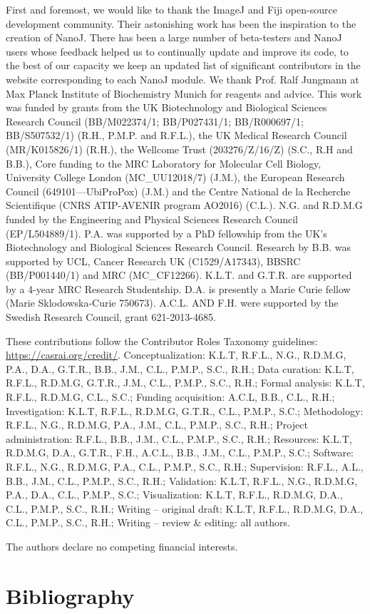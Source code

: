 \begin{acknowledgements}
 First and foremost, we would like to thank the ImageJ and Fiji open-source development community. Their astonishing work has been the inspiration to the creation of NanoJ. There has been a large number of beta-testers and NanoJ users whose feedback helped us to continually update and improve its code, to the best of our capacity we keep an updated list of significant contributors in the website corresponding to each NanoJ module. We thank Prof. Ralf Jungmann at Max Planck Institute of Biochemistry Munich for reagents and advice.  This work was funded by grants from the UK Biotechnology and Biological Sciences Research Council (BB/M022374/1; BB/P027431/1; BB/R000697/1; BB/S507532/1) (R.H., P.M.P. and R.F.L.), the UK Medical Research Council (MR/K015826/1) (R.H.), the Wellcome Trust (203276/Z/16/Z) (S.C., R.H and B.B.), Core funding to the MRC Laboratory for Molecular Cell Biology, University College London (MC\_UU12018/7) (J.M.), the European Research Council (649101—UbiProPox) (J.M.) and the Centre National de la Recherche Scientifique (CNRS ATIP-AVENIR program AO2016) (C.L.). N.G. and R.D.M.G funded by the Engineering and Physical Sciences Research Council (EP/L504889/1). P.A. was supported by a PhD fellowship from the UK’s Biotechnology and Biological Sciences Research Council. Research by B.B. was supported by UCL, Cancer Research UK (C1529/A17343), BBSRC (BB/P001440/1) and MRC (MC\_CF12266). K.L.T. and G.T.R. are supported by a 4-year MRC Research Studentship. D.A. is presently a Marie Curie fellow (Marie Sklodowska-Curie 750673). A.C.L. AND F.H. were supported by the Swedish Research Council, grant 621-2013-4685.
\end{acknowledgements}

\begin{contributions}
 These contributions follow the Contributor Roles Taxonomy guidelines: \href{https://casrai.org/credit/}{https://casrai.org/credit/}.
 Conceptualization: K.L.T, R.F.L., N.G., R.D.M.G, P.A., D.A., G.T.R., B.B., J.M., C.L., P.M.P., S.C., R.H.;
 Data curation: K.L.T, R.F.L., R.D.M.G, G.T.R., J.M., C.L., P.M.P., S.C., R.H.;
 Formal analysis:  K.L.T, R.F.L., R.D.M.G, C.L., S.C.;
 Funding acquisition:  A.C.L, B.B., C.L., R.H.;
 Investigation: K.L.T, R.F.L., R.D.M.G, G.T.R., C.L., P.M.P., S.C.;
 Methodology: R.F.L., N.G., R.D.M.G, P.A., J.M., C.L., P.M.P., S.C., R.H.;
 Project administration: R.F.L., B.B., J.M., C.L., P.M.P., S.C., R.H.;
 Resources: K.L.T, R.D.M.G, D.A., G.T.R., F.H., A.C.L., B.B., J.M., C.L., P.M.P., S.C.;
 Software: R.F.L., N.G., R.D.M.G, P.A., C.L., P.M.P., S.C., R.H.;
 Supervision: R.F.L., A.L., B.B., J.M., C.L., P.M.P., S.C., R.H.;
 Validation: K.L.T, R.F.L., N.G., R.D.M.G, P.A., D.A., C.L., P.M.P., S.C.;
 Visualization:  K.L.T, R.F.L., R.D.M.G, D.A., C.L., P.M.P., S.C., R.H.;
 Writing – original draft: K.L.T, R.F.L., R.D.M.G, D.A., C.L., P.M.P., S.C., R.H.;
 Writing – review \& editing: all authors.

\end{contributions}

\begin{interests}
 The authors declare no competing financial interests.
\end{interests}

\section*{Bibliography}


